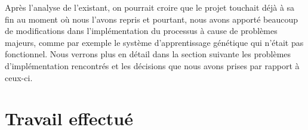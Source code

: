 \documentclass[a4paper,11pt]{article}
\begin{document}
Après l'analyse de l'existant, on pourrait croire que le projet touchait déjà à sa fin au moment où nous l'avons repris et pourtant, nous avons apporté beaucoup de modifications dans l'implémentation du processus à cause de problèmes majeurs, comme par exemple le système d'apprentissage génétique qui n'était pas fonctionnel. Nous verrons plus en détail dans la section suivante les problèmes d'implémentation rencontrés et les décisions que nous avons prises par rapport à ceux-ci.



\section{Travail effectué}


\end{document}
